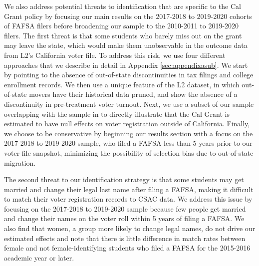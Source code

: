 \documentclass[12pt,letterpaper,oneside]{book}
\begin{document}
We also address potential threats to identification that are specific to the Cal Grant policy by focusing our main results on the 2017-2018 to 2019-2020 cohorts of FAFSA filers before broadening our sample to the 2010-2011 to 2019-2020 filers. The first threat is that some students who barely miss out on the grant may leave the state, which would make them unobservable in the outcome data from L2's California voter file. To address this risk, we use four different approaches that we describe in detail in Appendix \ref{sec:appendixasub}. We start by pointing  to the absence of out-of-state discontinuities in tax filings and college enrollment records. We then use a unique feature of the L2 dataset, in which out-of-state movers have their historical data pruned, and show the absence of a discontinuity in pre-treatment voter turnout. Next, we use a subset of our sample overlapping with the sample in \cite{firoozi_effect_2023} to directly illustrate that the Cal Grant is estimated to have null effects on voter registration outside of California. Finally, we choose to be conservative by beginning our results section with a focus on the 2017-2018 to 2019-2020 sample, who filed a FAFSA less than 5 years prior to our voter file snapshot, minimizing the possibility of selection bias due to out-of-state migration.

The second threat to our identification strategy is that some students may get married and change their legal last name after filing a FAFSA, making it difficult to match their voter registration records to CSAC data. We address this issue by focusing on the 2017-2018 to 2019-2020 sample because few people get married and change their names on the voter roll within 5 years of filing a FAFSA. We also find that women, a group more likely to change legal names, do not drive our estimated effects and note that there is little difference in match rates between female and not female-identifying students who filed a FAFSA for the 2015-2016 academic year or later.
\end{document}
